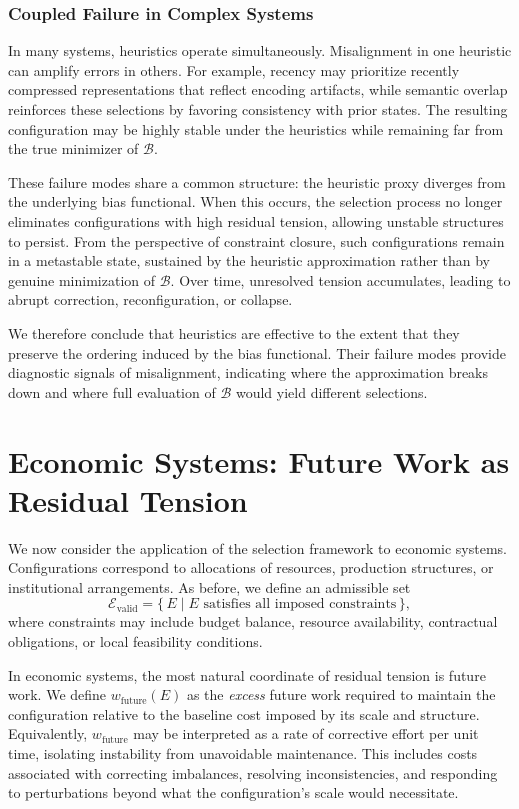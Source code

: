 \documentclass[11pt]{article}
\theoremstyle{plain}
\theoremstyle{definition}
\theoremstyle{remark}
\begin{document}
\subsubsection*{Coupled Failure in Complex Systems}

In many systems, heuristics operate simultaneously. Misalignment in one heuristic can amplify errors in others. For example, recency may prioritize recently compressed representations that reflect encoding artifacts, while semantic overlap reinforces these selections by favoring consistency with prior states. The resulting configuration may be highly stable under the heuristics while remaining far from the true minimizer of $\mathcal{B}$.

These failure modes share a common structure: the heuristic proxy diverges from the underlying bias functional. When this occurs, the selection process no longer eliminates configurations with high residual tension, allowing unstable structures to persist. From the perspective of constraint closure, such configurations remain in a metastable state, sustained by the heuristic approximation rather than by genuine minimization of $\mathcal{B}$. Over time, unresolved tension accumulates, leading to abrupt correction, reconfiguration, or collapse.

We therefore conclude that heuristics are effective to the extent that they preserve the ordering induced by the bias functional. Their failure modes provide diagnostic signals of misalignment, indicating where the approximation breaks down and where full evaluation of $\mathcal{B}$ would yield different selections.

\section{Economic Systems: Future Work as Residual Tension}

We now consider the application of the selection framework to economic systems. Configurations correspond to allocations of resources, production structures, or institutional arrangements. As before, we define an admissible set
\[
\mathcal{E}_{\mathrm{valid}} = \{\, E \mid E \text{ satisfies all imposed constraints} \,\},
\]
where constraints may include budget balance, resource availability, contractual obligations, or local feasibility conditions.

In economic systems, the most natural coordinate of residual tension is future work. We define $w_{\mathrm{future}}(E)$ as the \emph{excess} future work required to maintain the configuration relative to the baseline cost imposed by its scale and structure. Equivalently, $w_{\mathrm{future}}$ may be interpreted as a rate of corrective effort per unit time, isolating instability from unavoidable maintenance. This includes costs associated with correcting imbalances, resolving inconsistencies, and responding to perturbations beyond what the configuration's scale would necessitate.
\end{document}
